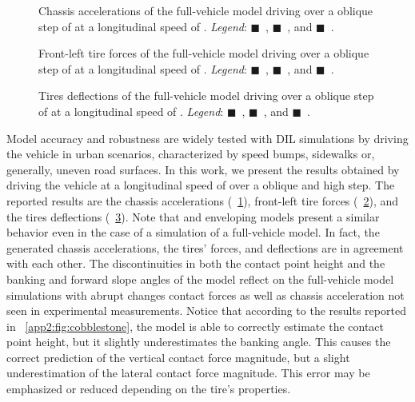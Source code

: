\begin{figure}[htb]
  \centering
  \caption{Chassis accelerations of the full-vehicle model driving over a  oblique step of  at a longitudinal speed of . \emph{Legend}:
  {\color{mycolor1}$\blacksquare$}~\Enve{}, {\color{mycolor2}$\blacksquare$}~\Swift{}, and {\color{mycolor3}$\blacksquare$}~\TMEasy{}.}
  \label{app2:fig:accelerations}
\end{figure}

\begin{figure}[htb]
  \centering
  \caption{Front-left tire forces of the full-vehicle model driving over a  oblique step of  at a longitudinal speed of . \emph{Legend}: {\color{mycolor1}$\blacksquare$}~\Enve{}, {\color{mycolor2}$\blacksquare$}~\Swift{}, and {\color{mycolor3}$\blacksquare$}~\TMEasy{}.}
  \label{app2:fig:forces}
\end{figure}

\begin{figure}[htb]
  \centering
  \caption{Tires deflections of the full-vehicle model driving over a  oblique step of  at a longitudinal speed of . \emph{Legend}: {\color{mycolor1}$\blacksquare$}~\Enve{}, {\color{mycolor2}$\blacksquare$}~\Swift{}, and {\color{mycolor3}$\blacksquare$}~\TMEasy{}.}
  \label{app2:fig:rho}
\end{figure}

Model accuracy and robustness are widely tested with DIL simulations by driving the vehicle in urban scenarios, characterized by speed bumps, sidewalks or, generally, uneven road surfaces. In this work, we present the results obtained by driving the vehicle at a longitudinal speed of  over a  oblique and  high step. The reported results are the chassis accelerations (\figurename{}~\ref{app2:fig:accelerations}), front-left tire forces (\figurename{}~\ref{app2:fig:forces}), and the tires deflections (\figurename{}~\ref{app2:fig:rho}). Note that \Enve{} and \Swift{} enveloping models present a similar behavior even in the case of a simulation of a full-vehicle model. In fact, the generated chassis accelerations, the tires' forces, and deflections are in agreement with each other. The discontinuities in both the contact point height and the banking and forward slope angles of the \TMEasy{} model reflect on the full-vehicle model simulations with abrupt changes contact forces as well as chassis acceleration not seen in experimental measurements. Notice that according to the results reported in \figurename{}~\ref{app2:fig:cobblestone}, the \Enve{} model is able to correctly estimate the contact point height, but it slightly underestimates the banking angle. This causes the correct prediction of the vertical contact force magnitude, but a slight underestimation of the lateral contact force magnitude. This error may be emphasized or reduced depending on the tire's properties.

